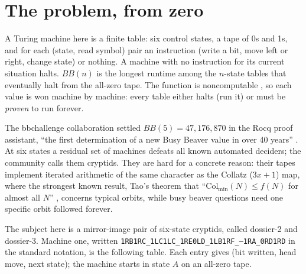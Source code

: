 \documentclass[11pt]{article}
\begin{document}
\begin{abstract}
on a verification spectrum whose proven endpoint is
$\mathsf{MIP}^{*} = \mathsf{RE}$: kernel checking at the bottom,
certified predictive emulation (this paper) in the middle, and
entangled-prover verification of halting-type claims as the goal. Every
empirical claim is validated against $10^{9}$ raw machine steps, and
the recurrence is tested for $10^{8}$ iterations. For the theory of
learning, the pipeline is representation learning carried to a
proof, and it is offered as a benchmark: unbounded, exactly labeled,
law-governed sequence data on which a learned representation has a
provable ground truth, with a two-prover game that verifies the
forecasts of any learned emulator at constant cost per check.
\end{abstract}

\section{The problem, from zero}
A Turing machine here is a finite table: six control states, a tape
of 0s and 1s, and for each (state, read symbol) pair an instruction
(write a bit, move left or right, change state) or nothing. A
machine with no instruction for its current situation halts.
$BB(n)$ is the longest runtime among the $n$-state tables that
eventually halt from the all-zero tape. The function is
noncomputable \cite{aaronson,michel}, so each value is won machine
by machine: every table either halts (run it) or must be
\emph{proven} to run forever.

The bbchallenge collaboration settled $BB(5)=47{,}176{,}870$ in the
Rocq proof assistant, ``the first determination of a new Busy Beaver
value in over 40 years'' \cite{coqbb5,deciders}. At six states a
residual set of machines defeats all known automated deciders; the
community calls them cryptids. They are hard for a concrete reason:
their tapes implement iterated arithmetic of the same character as
the Collatz ($3x{+}1$) map, where the strongest known result, Tao's
theorem that ``$\mathrm{Col}_{\min}(N) \le f(N)$ for almost all
$N$'' \cite{tao-collatz}, concerns typical orbits, while busy
beaver questions need one specific orbit followed forever.

The subject here is a mirror-image pair of six-state cryptids,
called dossier-2 and dossier-3. Machine one, written
\texttt{1RB1RC\_1LC1LC\_1RE0LD\_1LB1RF\_---1RA\_0RD1RD} in the standard
notation, is the following table. Each entry gives (bit written, head
move, next state); the machine starts in state $A$ on an all-zero tape.
\end{document}
